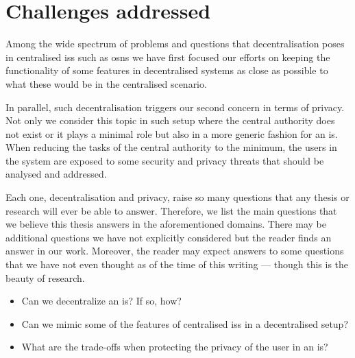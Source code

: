 \documentclass[showtrims,oldfontcommands]{kthesis}
\begin{document}


\section{Challenges addressed}
    \label{section:challenges-addressed}
Among the wide spectrum of problems and questions that decentralisation poses in 
centralised \acp{is} such as \acp{osn} we have first focused our efforts on keeping 
the functionality of some features in decentralised systems as close as possible 
to what these would be in the centralised scenario.

In parallel, such decentralisation triggers our second concern in terms of privacy.
Not only we consider this topic in such setup where the central authority does not 
exist or it plays a minimal role but also in a more generic fashion for an \ac{is}. 
When reducing the tasks of the central authority to the minimum, the users in the 
system are exposed to some security and privacy threats that should be analysed 
and addressed.

Each one, decentralisation and privacy, raise so many questions that any thesis 
or research will ever be able to answer. Therefore, we list the main questions that 
we believe this thesis answers in the aforementioned domains. There may be additional 
questions we have not explicitly considered but the reader finds an answer in our 
work. Moreover, the reader may expect answers to some questions that we have not 
even thought as of the time of this writing --- though this is the beauty of research.

\begin{itemize}
    \item Can we decentralize an \ac{is}? If so, how?\\
    \item Can we mimic some of the features of centralised \acp{is} in a decentralised setup?\\
    \item What are the trade-offs when protecting the privacy of the user in an \ac{is}?\\
\end{itemize}
\end{document}
